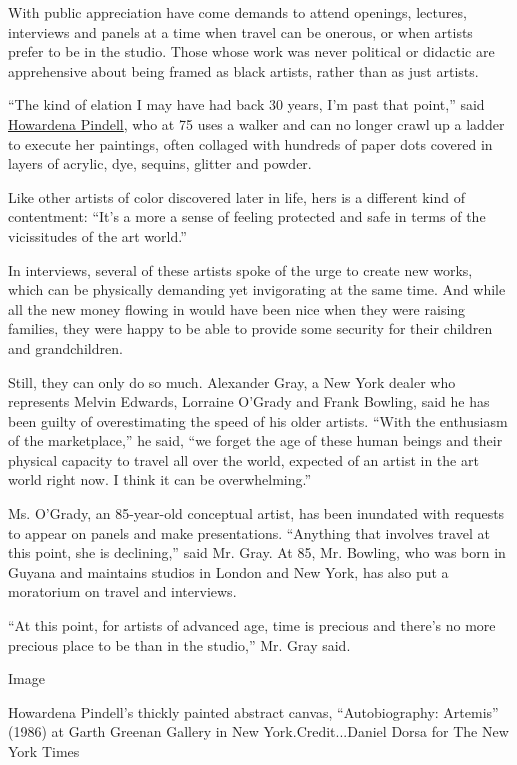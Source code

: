 With public appreciation have come demands to attend openings, lectures,
interviews and panels at a time when travel can be onerous, or when
artists prefer to be in the studio. Those whose work was never political
or didactic are apprehensive about being framed as black artists, rather
than as just artists.

``The kind of elation I may have had back 30 years, I'm past that
point,'' said
\href{https://mcachicago.org/Exhibitions/2018/Howardena-Pindell}{Howardena
Pindell}, who at 75 uses a walker and can no longer crawl up a ladder to
execute her paintings, often collaged with hundreds of paper dots
covered in layers of acrylic, dye, sequins, glitter and powder.

Like other artists of color discovered later in life, hers is a
different kind of contentment: ``It's a more a sense of feeling
protected and safe in terms of the vicissitudes of the art world.''

In interviews, several of these artists spoke of the urge to create new
works, which can be physically demanding yet invigorating at the same
time. And while all the new money flowing in would have been nice when
they were raising families, they were happy to be able to provide some
security for their children and grandchildren.

Still, they can only do so much. Alexander Gray, a New York dealer who
represents Melvin Edwards, Lorraine O'Grady and Frank Bowling, said he
has been guilty of overestimating the speed of his older artists. ``With
the enthusiasm of the marketplace,'' he said, ``we forget the age of
these human beings and their physical capacity to travel all over the
world, expected of an artist in the art world right now. I think it can
be overwhelming.''

Ms. O'Grady, an 85-year-old conceptual artist, has been inundated with
requests to appear on panels and make presentations. ``Anything that
involves travel at this point, she is declining,'' said Mr. Gray. At 85,
Mr. Bowling, who was born in Guyana and maintains studios in London and
New York, has also put a moratorium on travel and interviews.

``At this point, for artists of advanced age, time is precious and
there's no more precious place to be than in the studio,'' Mr. Gray
said.

Image

Howardena Pindell's thickly painted abstract canvas, ``Autobiography:
Artemis'' (1986) at Garth Greenan Gallery in New York.Credit...Daniel
Dorsa for The New York Times


